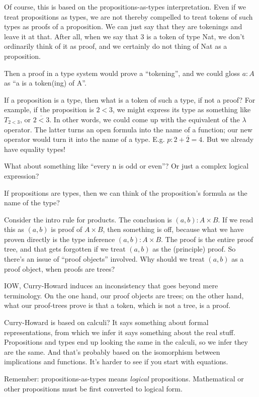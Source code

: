 Of course, this is based on the propositions-as-types interpretation.
Even if we treat propositions as types, we are not thereby compelled
to treat tokens of such types as proofs of a proposition. We can just
say that they are tokenings and leave it at that. After all, when we
say that 3 is a token of type Nat, we don't ordinarily think of it as
proof, and we certainly do not thing of Nat as a proposition.

Then a proof in a type system would prove a ``tokening'', and we could
gloss \(a:A\) as ``a is a token(ing) of A''.

If a proposition is a type, then what is a token of such a type, if
not a proof? For example, if the proposition is \(2<3\), we might
express its type as something like \(T_{2<3}\), or \(\overline{2<3}\).
In other words, we could come up with the equivalent of the
\(\lambda\) operator. The latter turns an open formula into the name
of a function; our new operator would turn it into the name of a type.
E.g. \(p: \overline{2+2=4}\).  But we already have equality types!

What about something like ``every n is odd or even''? Or just a
complex logical expression?

If propositions are types, then we can think of the proposition's
formula as the name of the type?

Consider the intro rule for products. The conclusion is
\((a,b):A\times B\). If we read this as \((a,b)\) is proof of
\(A\times B\), then something is off, because what we have proven
directly is the type inference \((a,b):A\times B\). The proof is the
entire proof tree, and that gets forgotten if we treat \((a,b)\) as
the (principle) proof. So there's an issue of ``proof objects''
involved. Why should we treat \((a,b)\) as a proof object, when proofs
are trees?

IOW, Curry-Howard induces an inconsistency that goes beyond mere
terminology. On the one hand, our proof objects are trees; on the
other hand, what our proof-trees prove is that a token, which is not a
tree, is a proof.

Curry-Howard is based on calculi? It says something about formal
representations, from which we infer it says something about the real
stuff. Propositions and types end up looking the same in the calculi,
so we infer they are the same. And that's probably based on the
isomorphism between implications and functions. It's harder to see if
you start with equations.

Remember: propositions-as-types means \textit{logical} propositions.
Mathematical or other propositions must be first converted to logical
form.

